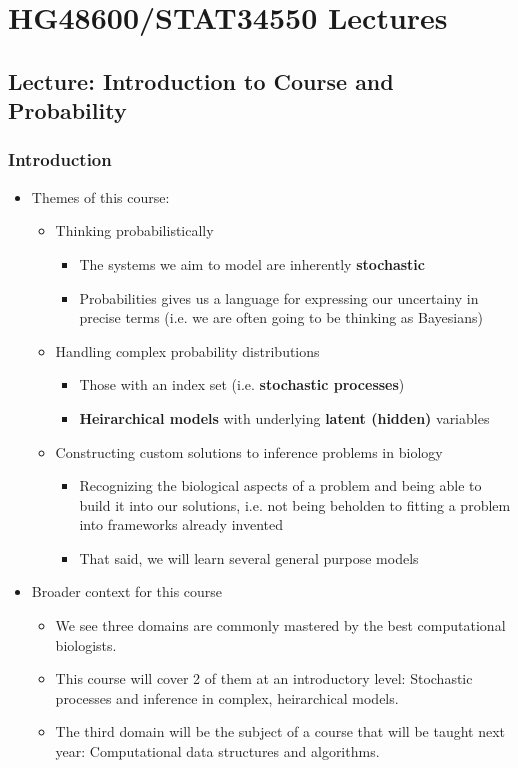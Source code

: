 \documentclass[10pt,containsverbatim,paralist]{article}
\date{\today}
\title{}
\begin{document}
\section{HG48600/STAT34550 Lectures}
\label{sec-1}
\subsection{Lecture: Introduction to Course and Probability}
\label{sec-1-1}
\subsubsection*{Introduction}
\label{sec-1-1-1}
\begin{itemize}
\item Themes of this course:
\label{sec-1-1-1-1}
\begin{itemize}
\item Thinking probabilistically
\label{sec-1-1-1-1-1}
\begin{itemize}
\item The systems we aim to model are inherently \textbf{stochastic}
\item Probabilities gives us a language for expressing our uncertainy in
precise terms (i.e. we are often going to be thinking as Bayesians)
\end{itemize}
\item Handling complex probability distributions
\label{sec-1-1-1-1-2}
\begin{itemize}
\item Those with an index set (i.e. \textbf{stochastic processes})
\item \textbf{Heirarchical models} with underlying \textbf{latent (hidden)} variables
\end{itemize}
\item Constructing custom solutions to inference problems in biology
\label{sec-1-1-1-1-3}
\begin{itemize}
\item Recognizing the biological aspects of a problem and being able to build it
into our solutions, i.e. not being beholden to fitting a problem into
frameworks already invented
\item That said, we will learn several general purpose models
\end{itemize}
\end{itemize}
\item Broader context for this course
\label{sec-1-1-1-2}
\begin{itemize}
\item We see three domains are commonly mastered by the best computational biologists.
\label{sec-1-1-1-2-1}
\item This course will cover 2 of them at an introductory level: Stochastic processes and inference in complex, heirarchical models.
\label{sec-1-1-1-2-2}
\item The third domain will be the subject of a course that will be taught next year: Computational data structures and algorithms.
\label{sec-1-1-1-2-3}
\end{itemize}
\end{itemize}
\end{document}
